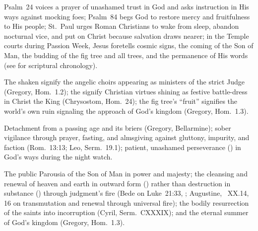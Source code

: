 \begin{fourSenses}
\item[Literal.] Psalm~24 voices a prayer of unashamed trust in God and asks instruction in His ways against mocking foes; Psalm~84 begs God to restore mercy and fruitfulness to His people; St.~Paul urges Roman Christians to wake from sleep, abandon nocturnal vice, and put on Christ because salvation draws nearer; in the Temple courts during Passion Week, Jesus foretells cosmic signs, the coming of the Son of Man, the budding of the fig tree and all trees, and the permanence of His words (see \hyperref[sec:date-location]{} for scriptural chronology).
\item[Allegorical.] The shaken  signify the angelic choirs appearing as ministers of the strict Judge (Gregory, Hom.~1.2); the  signify Christian virtues shining as festive battle-dress in Christ the King (Chrysostom, Hom.~24); the fig tree's ``fruit'' signifies the world's own ruin signaling the approach of God's kingdom (Gregory, Hom.~1.3).
\item[Moral.] Detachment from a passing age and its briers (Gregory, Bellarmine); sober vigilance through prayer, fasting, and almsgiving against gluttony, impurity, and faction (Rom.~13:13; Leo, Serm.~19.1); patient, unashamed perseverance () in God's ways during the night watch.
\item[Anagogical.] The public Parousia of the Son of Man in power and majesty; the cleansing and renewal of heaven and earth in outward form () rather than destruction in substance () through judgment's fire (Bede on Luke~21:33, ; Augustine, ~XX.14, 16 on transmutation and renewal through universal fire); the bodily resurrection of the saints into incorruption (Cyril, Serm.~CXXXIX); and the eternal summer of God's kingdom (Gregory, Hom.~1.3).
\end{fourSenses}

